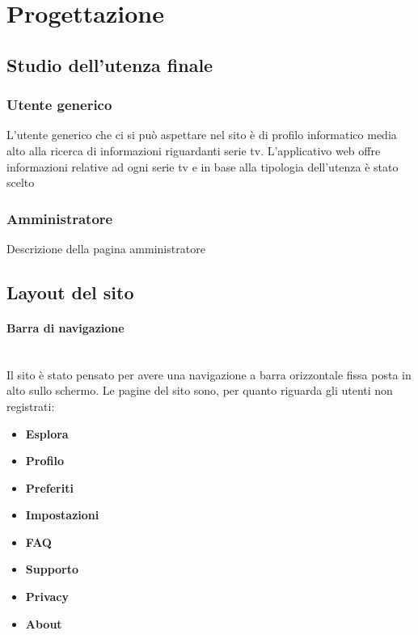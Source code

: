 \newpage
\section{Progettazione}
\subsection{Studio dell'utenza finale}
\subsubsection{Utente generico}
L'utente generico che ci si può aspettare nel sito è di profilo informatico media alto alla ricerca di informazioni riguardanti serie tv. L'applicativo web offre informazioni relative ad ogni serie tv e in base alla tipologia dell'utenza è stato scelto 


\subsubsection{Amministratore}
Descrizione della pagina amministratore 

\subsection{Layout del sito}


\paragraph{Barra di navigazione}
~\\Il sito è stato pensato per avere una navigazione a barra orizzontale fissa posta in alto sullo schermo. Le pagine del sito sono, per quanto riguarda gli utenti non registrati:
\begin{itemize}
	\item \textbf{\normalsize{Esplora}}
	\item \textbf{\normalsize{Profilo}}
	\item \textbf{\normalsize{Preferiti}}
	\item \textbf{\normalsize{Impostazioni}}
	\item \textbf{\normalsize{FAQ}}
	\item \textbf{\normalsize{Supporto}}	
	\item \textbf{\normalsize{Privacy}}
	\item \textbf{\normalsize{About}}
\end{itemize}

